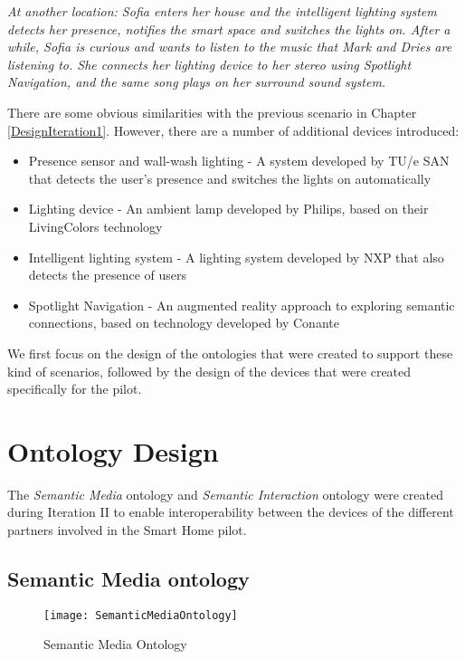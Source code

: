 \textit{At another location: Sofia enters her house and the intelligent lighting system detects her presence, notifies the smart space and switches the lights on. After a while, Sofia is curious and wants to listen to the music that Mark and Dries are listening to. She connects her lighting device to her stereo using Spotlight Navigation, and the same song plays on her surround sound system.}

There are some obvious similarities with the previous scenario in Chapter \ref{DesignIteration1}. However, there are a number of additional devices introduced:

\begin{itemize}
	\item Presence sensor and wall-wash lighting - A system developed by TU/e \ac{SAN} that detects the user's presence and switches the lights on automatically
	\item Lighting device - An ambient lamp developed by Philips, based on their LivingColors technology
	\item Intelligent lighting system - A lighting system developed by NXP that also detects the presence of users
	\item Spotlight Navigation - An augmented reality approach to exploring semantic connections, based on technology developed by Conante
\end{itemize}

We first focus on the design of the ontologies that were created to support these kind of scenarios, followed by the design of the devices that were created specifically for the pilot.


\section{Ontology Design}
\label{OntologyDesign2}

The \emph{Semantic Media} ontology and \emph{Semantic Interaction} ontology were created during Iteration II to enable interoperability between the devices of the different partners involved in the Smart Home pilot.

\subsection{Semantic Media ontology}
\label{SemanticMediaOntology}

\begin{figure}
\centering
\texttt{[image: SemanticMediaOntology]}
\caption{Semantic Media Ontology}
\label{semanticMediaOntology}
\end{figure}

